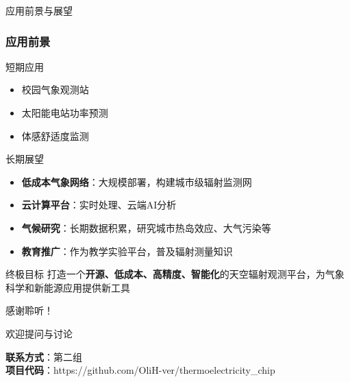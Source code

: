 \documentclass[aspectratio=169,11pt]{ctexbeamer}
\begin{document}
\begin{frame}{应用前景与展望}
\frametitle{应用前景}
\begin{block}{短期应用}
\begin{itemize}
    \item 校园气象观测站
    \item 太阳能电站功率预测
    \item 体感舒适度监测
\end{itemize}
\end{block}

\begin{block}{长期展望}
\begin{itemize}
    \item \textbf{低成本气象网络}：大规模部署，构建城市级辐射监测网
    \item \textbf{云计算平台}：实时处理、云端AI分析
    \item \textbf{气候研究}：长期数据积累，研究城市热岛效应、大气污染等
    \item \textbf{教育推广}：作为教学实验平台，普及辐射测量知识
\end{itemize}
\end{block}

\begin{alertblock}{终极目标}
打造一个\textbf{开源、低成本、高精度、智能化}的天空辐射观测平台，为气象科学和新能源应用提供新工具
\end{alertblock}
\end{frame}

\begin{frame}
\centering
\Huge 感谢聆听！

\vspace{1cm}

\Large 欢迎提问与讨论

\vspace{1cm}

\normalsize
\textbf{联系方式}：第二组 \\
\textbf{项目代码}：https://github.com/OliH-ver/thermoelectricity\_chip
\end{frame}
\end{document}

